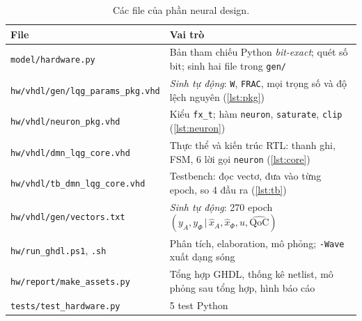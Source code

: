 \documentclass[11pt,a4paper]{article}
\newcommand{\QoC}{\mathrm{QoC}}
\newcommand{\code}[1]{\texttt{#1}}
\begin{document}
\begin{table}[H]
\centering\footnotesize
\caption{Các file của phần neural design.}
\begin{tabular}{>{\raggedright\arraybackslash}p{5.5cm}p{10.0cm}}
\toprule
File & Vai trò \\
\midrule
\code{model/hardware.py} & Bản tham chiếu Python \emph{bit-exact}; quét số bit; sinh hai file trong \code{gen/} \\
\code{hw/vhdl/gen/lqg\_params\_pkg.vhd} & \emph{Sinh tự động}: \code{W}, \code{FRAC}, mọi trọng số và độ lệch nguyên (\cref{lst:pkg}) \\
\code{hw/vhdl/neuron\_pkg.vhd} & Kiểu \code{fx\_t}; hàm \code{neuron}, \code{saturate}, \code{clip} (\cref{lst:neuron}) \\
\code{hw/vhdl/dmn\_lqg\_core.vhd} & Thực thể và kiến trúc RTL: thanh ghi, FSM, 6 lời gọi \code{neuron} (\cref{lst:core}) \\
\code{hw/vhdl/tb\_dmn\_lqg\_core.vhd} & Testbench: đọc vectơ, đưa vào từng epoch, so 4 đầu ra (\cref{lst:tb}) \\
\code{hw/vhdl/gen/vectors.txt} & \emph{Sinh tự động}: 270 epoch $(y_A,y_\Phi\,|\,\hat x_A,\hat x_\Phi,u,\widehat{\QoC})$ \\
\code{hw/run\_ghdl.ps1}, \code{.sh} & Phân tích, elaboration, mô phỏng; \code{-Wave} xuất dạng sóng \\
\code{hw/report/make\_assets.py} & Tổng hợp GHDL, thống kê netlist, mô phỏng sau tổng hợp, hình báo cáo \\
\code{tests/test\_hardware.py} & 5 test Python \\
\bottomrule
\end{tabular}
\end{table}
\end{document}

